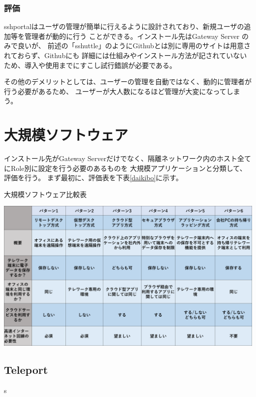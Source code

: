 \documentclass[11pt,a4j,titlepage]{jreport}
\begin{document}
\subsection*{評価}
sshportalはユーザの管理が簡単に行えるように設計されており、新規ユーザの追加等を管理者が動的に行う
ことができる。インストール先はGateway Server のみで良いが、
前述の「sshuttle」のようにGithubとは別に専用のサイトは用意されておらず、Githubにも
詳細には仕組みやインストール方法が記されていないため、導入や使用までにすこし試行錯誤が必要である。

その他のデメリットとしては、ユーザーの管理を自動ではなく、動的に管理者が行う必要があるため、
ユーザーが大人数になるほど管理が大変になってしまう。



\chapter{大規模ソフトウェア}
インストール先がGateway Serverだけでなく、隔離ネットワーク内のホスト全てにRole別に設定を行う必要のあるものを
大規模アプリケーションと分類して、評価を行う。
まず最初に、評価表を下表\ref{daikibo}に示す。

\begin{table}[H]
    \centering
    \caption{大規模ソフトウェア比較表}
    \includegraphics*[width=1.0\textwidth,page=5]{graphs/telework_list.pdf}
    \label{daikibo}
\end{table}

\section{Teleport}\label{teleport}s
\end{document}
